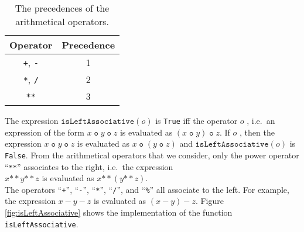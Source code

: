 \begin{table}[!ht]
  \centering
    \begin{tabular}{|c|c|}
    \hline
      Operator & Precedence \\
    \hline\hline
      \texttt{+}, \texttt{-} & 1 \\
    \hline
      \texttt{*}, \texttt{/} & 2 \\
    \hline
      \texttt{**}           & 3 \\
    \hline
    \end{tabular}
  \caption{The precedences of the arithmetical operators.}
  \label{tab:precedence}
\end{table}

The expression $\texttt{isLeftAssociative}(o)$ is \texttt{True} iff the operator $o$ 
,  i.e.~an expression of the form $x \;\mathtt{o}\; y \;\mathtt{o}\; z$
is evaluated as  $(x \;\mathtt{o}\; y) \;\mathtt{o}\; z$.  If $o$ ,
 then the expression  $x \;\mathtt{o}\; y \;\mathtt{o}\; z$
is evaluated as  $x \;\mathtt{o}\; (y \;\mathtt{o}\; z)$ and $\texttt{isLeftAssociative}(o)$
is \texttt{False}.  From the arithmetical operators that we consider, only the power operator ``\texttt{**}'' 
associates to the right, i.e.~the expression
\\[0.2cm]
\hspace*{1.3cm}
$x \mathtt{**} y \mathtt{**} z$ \quad is evaluated as \quad $x \mathtt{**} (y \mathtt{**} z)$.
\\[0.2cm]
The operators 
``\texttt{+}'', ``\texttt{-}'', ``\texttt{*}'', ``\texttt{/}'', and ``\texttt{\%}'' 
all associate to the left.  For example, the expression
$x - y - z$ is evaluated as $(x - y) - z$.
Figure \ref{fig:isLeftAssociative} shows the implementation of the function \texttt{isLeftAssociative}.

